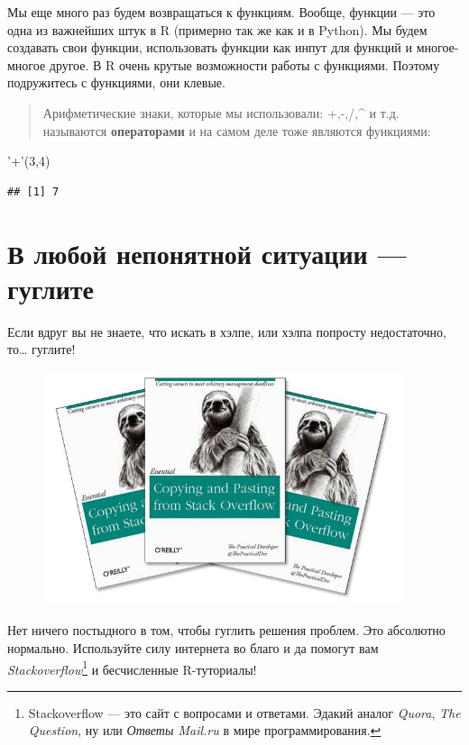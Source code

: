 \documentclass[]{book}
\newenvironment{Shaded}{\begin{snugshade}}{\end{snugshade}}
\newcommand{\DecValTok}[1]{\textcolor[rgb]{0.00,0.00,0.81}{#1}}
\newcommand{\StringTok}[1]{\textcolor[rgb]{0.31,0.60,0.02}{#1}}
\newcommand{\NormalTok}[1]{#1}
\begin{document}
Мы еще много раз будем возвращаться к функциям. Вообще, функции --- это
одна из важнейших штук в R (примерно так же как и в Python). Мы будем
создавать свои функции, использовать функции как инпут для функций и
многое-многое другое. В R очень крутые возможности работы с функциями.
Поэтому подружитесь с функциями, они клевые.

\begin{quote}
Арифметические знаки, которые мы использовали: +,-,/,\^{} и т.д.
называются \textbf{операторами} и на самом деле тоже являются функциями:
\end{quote}

\begin{Shaded}
\begin{Highlighting}[]
\StringTok{'+'}\NormalTok{(}\DecValTok{3}\NormalTok{,}\DecValTok{4}\NormalTok{)}
\end{Highlighting}
\end{Shaded}

\begin{verbatim}
## [1] 7
\end{verbatim}

\section{В любой непонятной ситуации --- гуглите}\label{google}

Если вдруг вы не знаете, что искать в хэлпе, или хэлпа попросту
недостаточно, то\ldots{} гуглите!

\begin{figure}
\centering
\includegraphics[width=4.16667in]{images/2AmXWgVoULk.jpg}
\caption{}
\end{figure}

Нет ничего постыдного в том, чтобы гуглить решения проблем. Это
абсолютно нормально. Используйте силу интернета во благо и да помогут
вам \emph{Stackoverflow}\footnote{Stackoverflow --- это сайт с вопросами
  и ответами. Эдакий аналог \emph{Quora}, \emph{The Question}, ну или
  \emph{Ответы Mail.ru} в мире программирования.} и бесчисленные
R-туториалы!
\end{document}
